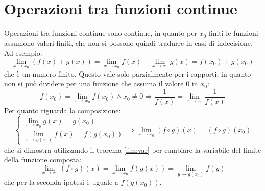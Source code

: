 %
%
%
%


\section{Operazioni tra funzioni continue}
Operazioni tra funzioni continue sono continue, in quanto per $x_0$ finiti le funzioni assumono valori finiti, che non si possono quindi tradurre in casi di indecisione. Ad esempio:
\[
	\lim_{x\to x_0} (f(x)+g(x))=\lim_{x\to x_0} f(x)+\lim_{x\to x_0} g(x)=f(x_0)+g(x_0)
\]
che è un numero finito. Questo vale solo parzialmente per i rapporti, in quanto non si può dividere per una funzione che assuma il valore $0$ in $x_0$:
\[
	f(x_0)=\lim_{x \to x_0} f(x_0) \land x_0 \neq 0\Rightarrow \frac{1}{f(x)}=\lim_{x\to x_0} \frac{1}{f(x)}
\]
Per quanto riguarda la composizione:
\[
	\begin{cases}
		\lim_{x\to x_0} g(x)=g(x_0) \\
		\lim_{x\to g(x_0)} f(x)=f(g(x_0))
	\end{cases}\Rightarrow
	\lim_{x\to x_0} (f\circ g)(x)=(f\circ g)(x_0)
\]
che si dimostra utilizzando il teorema \ref{lim:var} per cambiare la variabile del limite della funzione composta:
\[
	\lim_{x\to x_0} (f\circ g)(x)=\lim_{x\to x_0} f(g(x))=\lim_{y\to g(x_0)} f(y)
\]
che per la seconda ipotesi è uguale a $f(g(x_0))$.

